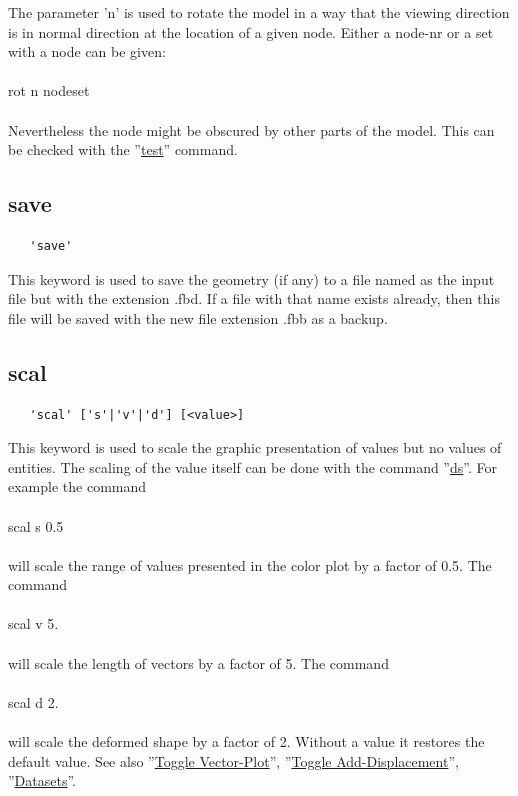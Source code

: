 \documentclass{article}
\providecommand{\htmlref}[2]{\hyperref[#2]{#1}}
\begin{document}
The parameter 'n' is used to rotate the model in a way that the viewing direction is in normal direction at the location of a given node. Either a node-nr or a set with a node can be given:\\\\rot n nodeset\\\\Nevertheless the node might be obscured by other parts of the model. This can be checked with the ''\htmlref{test}{test}'' command.

\subsection{\label{save}save}
\begin{verbatim}
   'save' 
\end{verbatim}
This keyword is used to save the geometry (if any) to a file named as the input file but with the extension .fbd. If a file with that name exists already, then this file will be saved with the new file extension .fbb as a backup.
 
\subsection{\label{scal}scal}
\begin{verbatim}
   'scal' ['s'|'v'|'d'] [<value>]
\end{verbatim}
This keyword is used to scale the graphic presentation of values but no values of entities. The scaling of the value itself can be done with the command ''\htmlref{ds}{ds}''. For example the command\\\\scal s 0.5\\\\will scale the range of values presented in the color plot by a factor of 0.5. The command\\\\scal v 5.\\\\will scale the length of vectors by a factor of 5. The command\\\\scal d 2.\\\\will scale the deformed shape by a factor of 2. Without a value it restores the default value. See also ''\htmlref{Toggle Vector-Plot}{Toggle Vector-Plot}'', ''\htmlref{Toggle Add-Displacement}{Toggle Add-Displacement}'', ''\htmlref{Datasets}{Datasets}''.
\end{document}

